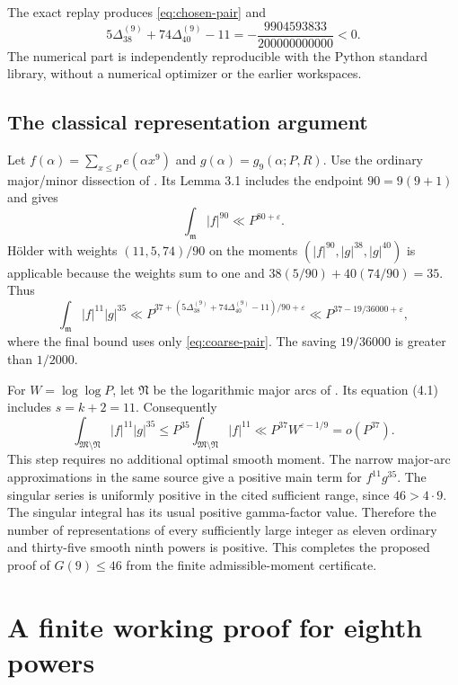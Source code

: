 \documentclass[11pt,letterpaper]{article}
\numberwithin{equation}{section}
\begin{document}
The exact replay produces \eqref{eq:chosen-pair} and
\begin{equation}
 5\Delta_{38}^{(9)}+74\Delta_{40}^{(9)}-11
             =-\frac{9904593833}{200000000000}<0.
 \label{eq:exact-criterion}
\end{equation}
The numerical part is independently reproducible with the Python standard
library, without a numerical optimizer or the earlier workspaces.

\subsection{The classical representation argument}

Let $f(\alpha)=\sum_{x\le P}e(\alpha x^9)$ and
$g(\alpha)=g_9(\alpha;P,R)$.  Use the ordinary major/minor dissection
of \cite[Section 2]{W16}.  Its Lemma 3.1 includes the endpoint
$90=9(9+1)$ and gives
\[
                    \int_{\mathfrak m}|f|^{90}\ll P^{80+\varepsilon}.
\]
H\"older with weights $(11,5,74)/90$ on the moments
$(|f|^{90},|g|^{38},|g|^{40})$ is applicable because the weights sum
to one and $38(5/90)+40(74/90)=35$.  Thus
\[
 \int_{\mathfrak m}|f|^{11}|g|^{35}
 \ll P^{37+(5\Delta_{38}^{(9)}+74\Delta_{40}^{(9)}-11)/90+\varepsilon}
 \ll P^{37-19/36000+\varepsilon},
\]
where the final bound uses only \eqref{eq:coarse-pair}.
The saving $19/36000$ is greater than $1/2000$.

For $W=\log\log P$, let $\mathfrak N$ be the logarithmic major arcs
of \cite[Section 4]{W16}.  Its equation (4.1) includes $s=k+2=11$.
Consequently
\[
 \int_{\mathfrak M\setminus\mathfrak N}|f|^{11}|g|^{35}
 \le P^{35}\int_{\mathfrak M\setminus\mathfrak N}|f|^{11}
 \ll P^{37}W^{\varepsilon-1/9}=o(P^{37}).
\]
This step requires no additional optimal smooth moment.  The narrow
major-arc approximations in the same source give a positive main term
for $f^{11}g^{35}$.  The singular series is uniformly positive in the
cited sufficient range, since $46>4\cdot9$.  The singular integral
has its usual positive gamma-factor value.  Therefore the number of
representations of every sufficiently large integer as eleven ordinary
and thirty-five smooth ninth powers is positive.  This completes the
proposed proof of $G(9)\le46$ from the finite admissible-moment certificate.

\par\bigskip{}

\section{A finite working proof for eighth powers}
\label{sec:g8-input-audit}
\end{document}
